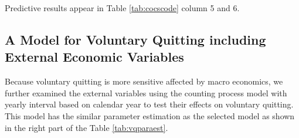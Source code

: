 \documentclass[12pt,letterpaper]{article}
\begin{document}
Predictive results appear in Table \ref{tab:cocscode} column 5 and 6. 


%	



\subsection{A Model for Voluntary Quitting including External Economic Variables}
Because voluntary quitting is more sensitive affected by macro economics, we further examined the external variables using the counting process model with yearly interval based on calendar year to test their effects on voluntary quitting. This model has the similar parameter estimation as the selected model as shown in the right part of the Table \ref{tab:vqparaest}.
\end{document}
